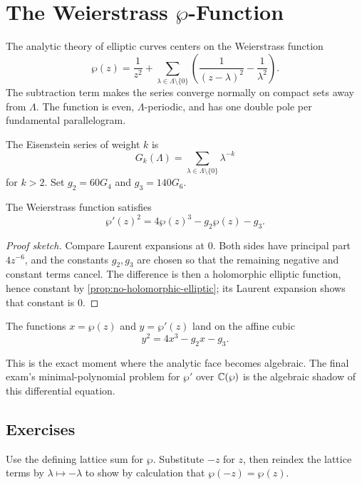 \chapter{The Weierstrass \texorpdfstring{\(\wp\)}{wp}-Function}
\label{ch:weierstrass-wp}

The analytic theory of elliptic curves centers on the Weierstrass function
\[
  \wp(z)=\frac{1}{z^2}+
  \sum_{\lambda\in\Lambda\setminus\{0\}}
  \left(\frac{1}{(z-\lambda)^2}-\frac{1}{\lambda^2}\right).
\]
The subtraction term makes the series converge normally on compact sets away from
\(\Lambda\).  The function is even, \(\Lambda\)-periodic, and has one double pole
per fundamental parallelogram.

\begin{definition}
The Eisenstein series of weight \(k\) is
\[
  G_k(\Lambda)=\sum_{\lambda\in\Lambda\setminus\{0\}}\lambda^{-k}
\]
for \(k>2\).  Set \(g_2=60G_4\) and \(g_3=140G_6\).
\end{definition}

\begin{theorem}
\label{thm:wp-ode-new}
The Weierstrass function satisfies
\[
  \wp'(z)^2=4\wp(z)^3-g_2\wp(z)-g_3.
\]
\end{theorem}

\begin{proof}[Proof sketch]
Compare Laurent expansions at \(0\).  Both sides have principal part
\(4z^{-6}\), and the constants \(g_2,g_3\) are chosen so that the remaining
negative and constant terms cancel.  The difference is then a holomorphic
elliptic function, hence constant by \cref{prop:no-holomorphic-elliptic}; its
Laurent expansion shows that constant is \(0\).
\end{proof}

\begin{corollary}
The functions \(x=\wp(z)\) and \(y=\wp'(z)\) land on the affine cubic
\[
  y^2=4x^3-g_2x-g_3.
\]
\end{corollary}

This is the exact moment where the analytic face becomes algebraic.  The final
exam's minimal-polynomial problem for \(\wp'\) over \(\mathbb{C}(\wp)\) is the algebraic
shadow of this differential equation.

\section*{Exercises}

\begin{exercise}
Use the defining lattice sum for \(\wp\).  Substitute \(-z\) for \(z\), then
reindex the lattice terms by \(\lambda\mapsto-\lambda\) to show by calculation
that \(\wp(-z)=\wp(z)\).
\end{exercise}

